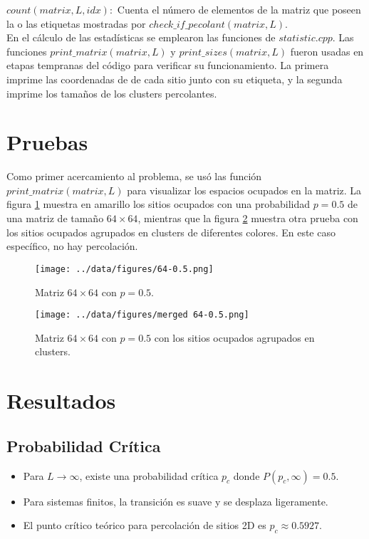 \documentclass[10pt,twocolumn]{article}
\begin{document}
    $count(matrix, L, idx):$ Cuenta el número de elementos de la matriz que poseen la o las etiquetas mostradas por
    $check\_if\_pecolant(matrix, L)$.\\

    En el cálculo de las estadísticas se emplearon las funciones de $statistic.cpp$. Las funciones $print\_matrix(matrix, L)$
    y $print\_sizes(matrix, L)$ fueron usadas en etapas tempranas del código para verificar su funcionamiento. La primera 
    imprime las coordenadas de de cada sitio junto con su etiqueta, y la segunda imprime los tamaños de los clusters
    percolantes.

\section{Pruebas}
    Como primer acercamiento al problema, se usó las función $print\_matrix(matrix, L)$ para visualizar los espacios ocupados
    en la matriz. La figura \ref{64-0.5} muestra en amarillo los sitios ocupados con una probabilidad $p = 0.5$ de una matriz
    de tamaño $64\times 64$, mientras que la figura \ref{merged 64-0.5} muestra otra prueba con los sitios ocupados agrupados
    en clusters de diferentes colores. En este caso específico, no hay percolación. 
   \begin{figure}[htbp]
    \centering
    \texttt{[image: ../data/figures/64-0.5.png]}
    \caption{Matriz $64\times 64$ con $p = 0.5$.}
    \label{64-0.5} 
   \end{figure} 

   \begin{figure}[htbp]
    \centering
    \texttt{[image: ../data/figures/merged 64-0.5.png]}
    \caption{Matriz $64\times 64$ con $p = 0.5$ con los sitios ocupados agrupados en clusters.}
    \label{merged 64-0.5} 
   \end{figure} 

\section{Resultados}

\subsection*{Probabilidad Crítica}
\begin{itemize}
    \item Para $L \to \infty$, existe una probabilidad crítica $p_c$ donde $P(p_c, \infty) = 0.5$.
    \item Para sistemas finitos, la transición es suave y se desplaza ligeramente.
    \item El punto crítico teórico para percolación de sitios 2D es $p_c \approx 0.5927$.
\end{itemize}
\end{document}

